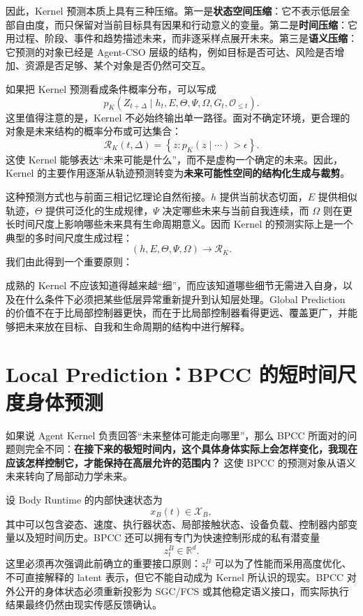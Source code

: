 因此，Kernel 预测本质上具有三种压缩。第一是\textbf{状态空间压缩}：它不表示低层全部自由度，而只保留对当前目标具有因果和行动意义的变量。第二是\textbf{时间压缩}：它用过程、阶段、事件和趋势描述未来，而非逐采样点展开未来。第三是\textbf{语义压缩}：它预测的对象已经是 Agent-CSO 层级的结构，例如目标是否可达、风险是否增加、资源是否足够、某个对象是否仍然可交互。

如果把 Kernel 预测看成条件概率分布，可以写成
\[
p_K
\left(
Z_{t+\Delta}
\mid
h_t,E,\Theta,\Psi,\Omega,G_t,\mathcal O_{\leq t}
\right).
\]
这里值得注意的是，Kernel 不必始终输出单一路径。面对不确定环境，更合理的对象是未来结构的概率分布或可达集合：
\[
\mathcal R_K(t,\Delta)
=
\left\{
z:
p_K(z\mid\cdots)>\epsilon
\right\}.
\]
这使 Kernel 能够表达“未来可能是什么”，而不是虚构一个确定的未来。因此，Kernel 的主要作用逐渐从轨迹预测转变为\textbf{未来可能性空间的结构化生成与裁剪}。

这种预测方式也与前面三相记忆理论自然衔接。$h$ 提供当前状态切面，$E$ 提供相似轨迹，$\Theta$ 提供可泛化的生成规律，$\Psi$ 决定哪些未来与当前自我连续，而 $\Omega$ 则在更长时间尺度上影响哪些未来具有生命周期意义。因而 Kernel 的预测实际上是一个典型的多时间尺度生成过程：
\[
(h,E,\Theta,\Psi,\Omega)
\longrightarrow
\mathcal R_K.
\]
我们由此得到一个重要原则：
\begin{statementbox}
\centering
{}
\end{statementbox}
成熟的 Kernel 不应该知道得越来越“细”，而应该知道哪些细节无需进入自身，以及在什么条件下必须把某些低层异常重新提升到认知层处理。Global Prediction 的价值不在于比局部控制器更快，而在于比局部控制器看得更远、覆盖更广，并能够把未来放在目标、自我和生命周期的结构中进行解释。

\section{Local Prediction：BPCC 的短时间尺度身体预测}

如果说 Agent Kernel 负责回答“未来整体可能走向哪里”，那么 BPCC 所面对的问题则完全不同：\textbf{在接下来的极短时间内，这个具体身体实际上会怎样变化，我现在应该怎样控制它，才能保持在高层允许的范围内？} 这使 BPCC 的预测对象从语义未来转向了局部动力学未来。

设 Body Runtime 的内部快速状态为
\[
x_B(t)\in\mathcal X_B,
\]
其中可以包含姿态、速度、执行器状态、局部接触状态、设备负载、控制器内部变量以及短时间历史。BPCC 还可以拥有专门为快速控制形成的私有潜变量
\[
z_t^{B}\in\mathbb R^d.
\]
这里必须再次强调此前确立的重要接口原则：$z_t^{B}$ 可以为了性能而采用高度优化、不可直接解释的 latent 表示，但它不能自动成为 Kernel 所认识的现实。BPCC 对外公开的身体状态必须重新投影为 SGC/FCS 或其他稳定语义接口，而实际执行结果最终仍然由现实传感反馈确认。


